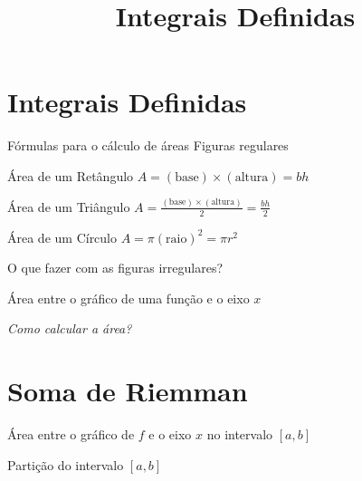\documentclass[fleqn,utf8,aspectratio=169,12pt]{beamer}
\title{Integrais Definidas}
\begin{document}
\addtitle

\section{Integrais Definidas}

\begin{frame}{Fórmulas para o cálculo de áreas}
  Figuras regulares

  \pause
  \bigskip
  Área de um Retângulo
  \tabto{45mm}
  \(
    A = (\text{base}) \times (\text{altura}) = bh
  \)

  \pause
  \bigskip
  Área de um Triângulo
  \tabto{45mm}
  \(
    A = \frac{(\text{base}) \times (\text{altura})}{2} = \frac{bh}{2}
  \)

  \pause
  \bigskip
  Área de um Círculo
  \tabto{45mm}
  \(
    A = \pi (\text{raio})^2 = \pi r^2
  \)

  \pause
  \bigskip
  O que fazer com as figuras irregulares?
\end{frame}

\begin{frame}{Área entre o gráfico de uma função e o eixo $x$}
  \centering
  \bigskip
  
  \pause
  \emph{Como calcular a área?}
\end{frame}



\section{Soma de Riemman}

\begin{frame}{Área entre o gráfico de $f$ e o eixo $x$ no intervalo $[a, b]$}
  \centering
  \bigskip
  
\end{frame}

\begin{frame}{Partição do intervalo $[a, b]$}
  \centering
  \bigskip
  
\end{frame}
\end{document}
